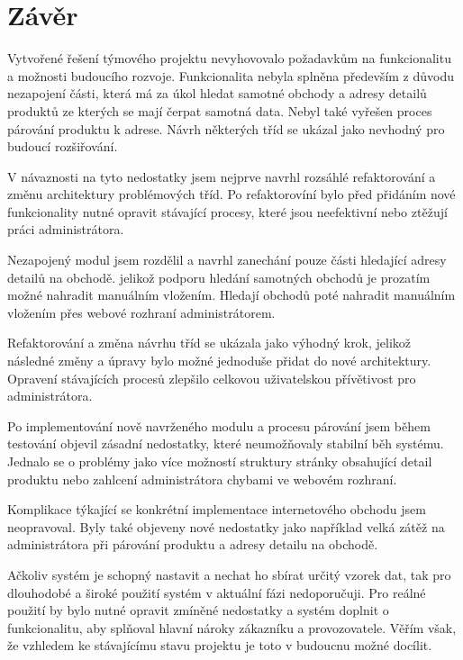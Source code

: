 \documentclass[thesis=B,czech]{FITthesis}[2012/06/26]
\begin{document}
\chapter{Závěr}
Vytvořené řešení týmového projektu nevyhovovalo požadavkům na funkcionalitu a možnosti budoucího rozvoje.
Funkcionalita nebyla splněna především z důvodu nezapojení části, která má za úkol hledat samotné obchody a adresy detailů produktů ze kterých
se mají čerpat samotná data. Nebyl také vyřešen proces párování produktu k adrese. Návrh některých tříd se ukázal jako nevhodný pro budoucí rozšiřování.
\par
V návaznosti na tyto nedostatky jsem nejprve navrhl rozsáhlé refaktorování a změnu architektury problémových tříd.
Po refaktorovíní bylo před přidáním nové funkcionality nutné opravit stávající procesy, které jsou neefektivní nebo 
ztěžují práci administrátora.
\par
Nezapojený modul jsem rozdělil a navrhl zanechání pouze části hledající adresy detailů na obchodě.
jelikož podporu hledání samotných obchodů je prozatím možné nahradit manuálním vložením. Hledají obchodů poté nahradit 
manuálním vložením přes webové rozhraní administrátorem.
\par
Refaktorování a změna návrhu tříd se ukázala jako výhodný krok, jelikož následné změny a úpravy bylo možné 
jednoduše přidat do nové architektury. Opravení stávajících procesů zlepšilo celkovou uživatelskou přívětivost pro
administrátora.
\par
Po implementování nově navrženého modulu a procesu párování jsem během testování objevil zásadní nedostatky, které
neumožňovaly stabilní běh systému. Jednalo se o problémy jako více možností struktury stránky obsahující detail produktu nebo zahlcení administrátora chybami ve webovém rozhraní. 
\par
Komplikace týkající se konkrétní implementace internetového obchodu jsem neopravoval. Byly také objeveny nové nedostatky 
jako například velká zátěž na administrátora při párování produktu a adresy detailu na obchodě.
\par
Ačkoliv systém je schopný nastavit a nechat ho sbírat určitý vzorek dat, tak pro dlouhodobé a široké použití systém v aktuální fázi nedoporučuji.
Pro reálné použití by bylo nutné opravit zmíněné nedostatky a systém doplnit o funkcionalitu, aby splňoval hlavní nároky
zákazníku a provozovatele. Věřím však, že vzhledem ke stávajícímu stavu projektu je toto v budoucnu možné docílit.



\end{document}
